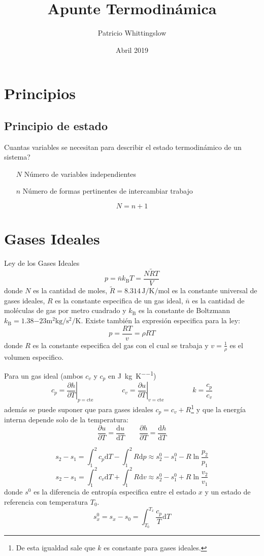 \documentclass{article}
\title{Apunte Termodinámica}
\author{Patricio Whittingslow}
\date{Abril 2019}
\newcommand{\ctegas}{k}
\newcommand{\cte}{\textrm{cte}}
\newcommand{\cp}{c_{p}}
\newcommand{\cv}{c_{v}}
\newcommand{\snaught}{s^{0}}
\newcommand{\Boltzmann}{k_{\textrm{B}}}
\newcommand{\moldens}{\bar{n}}
\newcommand{\spartial}[2]{\frac{\partial #1}{\partial #2}}
\newcommand{\di}{\textrm{d}}
\begin{document}
\maketitle
\section{Principios}
\subsection{Principio de estado}
Cuantas variables se necesitan para describir el estado termodinámico de un sistema?
\begin{itemize}
    \item[$N$] Número de variables independientes
    \item[$n$] Número de formas pertinentes de intercambiar trabajo
\end{itemize}
\[
N= n + 1
\]

\section{ Gases Ideales }
Ley de los Gases Ideales
\[p  = \moldens \Boltzmann T= \frac{N\tilde{R}T}{V}
\]
donde $N$ es la cantidad de moles, $\tilde{R}=8.314\, \si{\joule \per \kelvin\per \mole}$ es la constante universal de gases ideales, $R$ es la constante especifica de un gas ideal, $\moldens$ es la cantidad de moléculas de gas por metro cuadrado y $\Boltzmann$ es la constante de Boltzmann $\Boltzmann=\num{1,38}{-23} \si{\meter \squared \kilogram \per \second \squared \per \kelvin}$. Existe también la expresión especifica para la ley:
\[
p = \frac{RT}{v}=\rho RT
\]
donde $R$ es la constante especifica del gas con el cual se trabaja y $v=\frac{1}{\rho}$ es el volumen especifico.

Para un gas ideal (ambos $\cv$ y $\cp$ en \si{\joule \per \kilogram \per \kelvin})
\[
\cp = \left. \spartial{h}{T} \right|_{p=\cte} \qquad\qquad \cv = \left. \spartial{u}{T}\right|_{v = \cte} \qquad \qquad \ctegas=\frac{\cp}{\cv}
\]
además se puede suponer que para gases ideales $\cp = \cv +R$\footnote{De esta igualdad sale que $\ctegas$ es constante para gases ideales.} y que la energía interna depende solo de la temperatura:
\[
\spartial{u}{T}=\frac{\di u}{\di T}\qquad \spartial{h}{T}=\frac{\di h}{\di T}
\]

\[
s_2 -s_1 = \int_1^2\cp \di T - \int_1^2R\di p \approx \snaught_2 -\snaught_1 -R\ln \frac{p_2}{p_1}
\]
\[
s_2 -s_1 = \int_1^2\cv \di T +\int_1^2R\di v\approx \snaught_2 -\snaught_1 +R\ln \frac{v_2}{v_1}
\]
donde $\snaught$ es la diferencia de entropía especifica entre el estado $x$ y un estado de referencia con temperatura $T_0$.
\[
s^0_x=s_x - s_0 = \int_{T_0}^{T_x}\frac{\cp}{T}\di T
\]
\end{document}
